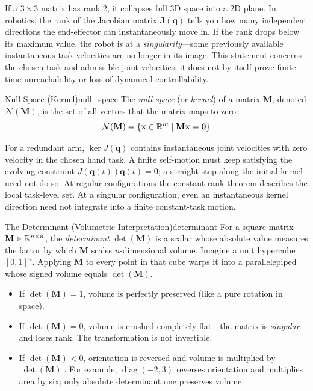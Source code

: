 If a $3 \times 3$ matrix has rank 2, it collapses full 3D space into a 2D plane. In robotics, the rank of the Jacobian matrix $\mathbf{J}(\mathbf{q})$ tells you how many independent directions the end-effector can instantaneously move in. If the rank drops below its maximum value, the robot is at a \emph{singularity}---some previously available instantaneous task velocities are no longer in its image. This statement concerns the chosen task and admissible joint velocities; it does not by itself prove finite-time unreachability or loss of dynamical controllability.

\begin{definition}{Null Space (Kernel)}{null_space}
The \emph{null space} (or \emph{kernel}) of a matrix $\mathbf{M}$, denoted $\mathcal{N}(\mathbf{M})$, is the set of all vectors that the matrix maps to zero:
\begin{equation}
    \mathcal{N}(\mathbf{M}) = \{ \mathbf{x} \in \mathbb{R}^m \mid \mathbf{M}\mathbf{x} = \mathbf{0} \}
\end{equation}
\end{definition}

For a redundant arm, $\ker J(\mathbf q)$ contains instantaneous joint velocities with zero velocity in the chosen hand task. A finite self-motion must keep satisfying the evolving constraint $J(\mathbf q(t))\dot{\mathbf q}(t)=0$; a straight step along the initial kernel need not do so. At regular configurations the constant-rank theorem describes the local task-level set. At a singular configuration, even an instantaneous kernel direction need not integrate into a finite constant-task motion.

\begin{definition}{The Determinant (Volumetric Interpretation)}{determinant}
For a square matrix $\mathbf{M} \in \mathbb{R}^{n \times n}$, the \emph{determinant} $\det(\mathbf{M})$ is a scalar whose absolute value measures the factor by which $\mathbf{M}$ scales $n$-dimensional volume. Imagine a unit hypercube $[0,1]^n$. Applying $\mathbf{M}$ to every point in that cube warps it into a parallelepiped whose signed volume equals $\det(\mathbf{M})$.
\end{definition}

\begin{itemize}
    \item If $\det(\mathbf{M}) = 1$, volume is perfectly preserved (like a pure rotation in space).
    \item If $\det(\mathbf{M}) = 0$, volume is crushed completely flat---the matrix is \emph{singular} and loses rank. The transformation is not invertible.
    \item If $\det(\mathbf{M}) < 0$, orientation is reversed and volume is multiplied by $|\det(\mathbf M)|$. For example, $\operatorname{diag}(-2,3)$ reverses orientation and multiplies area by six; only absolute determinant one preserves volume.
\end{itemize}

